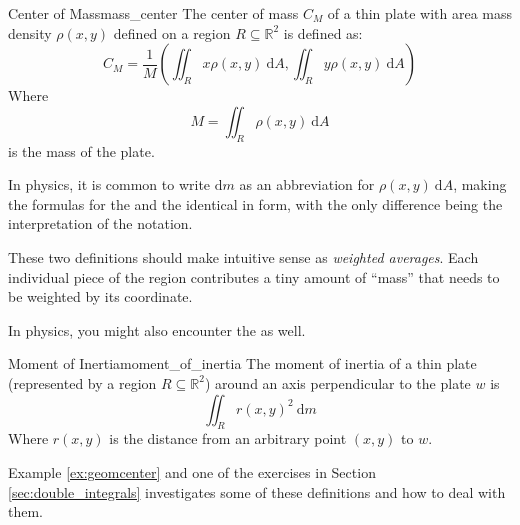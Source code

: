 \begin{adefinition}{Center of Mass}{mass_center}
    The center of mass $C_M$ of a thin plate with area mass density $\rho(x,y)$ defined on a region $R \subseteq \mathbb{R}^2$ is defined as:
    \begin{equation*}
        C_M = \frac{1}{M}\left(\iint_R x \rho(x,y) \ \mathrm{d} A, \iint_R y \rho(x,y) \ \mathrm{d} A \right)
    \end{equation*}
    Where
    \begin{equation*}
        M = \iint_R \rho(x,y) \ \mathrm{d} A
    \end{equation*}
    is the mass of the plate.

\end{adefinition}

\begin{remark}
    In physics, it is common to write $\mathrm{d} m$ as an abbreviation for $ \rho(x,y) \ \mathrm{d} A$, making the formulas for the  and the  identical in form, with the only difference being the interpretation of the notation.
\end{remark}

\begin{remark}
    These two definitions should make intuitive sense as \textit{weighted averages}. Each individual piece of the region contributes a tiny amount of ``mass'' that needs to be weighted by its coordinate.
\end{remark}

In physics, you might also encounter the  as well.

\begin{adefinition}{Moment of Inertia}{moment_of_inertia}
    The moment of inertia of a thin plate (represented by a region $R\subseteq \mathbb{R}^2$) around an axis perpendicular to the plate $w$ is
    \begin{equation*}
        \iint_R r(x,y)^2 \ \mathrm{d}m
    \end{equation*}
    Where $r(x,y)$ is the distance from an arbitrary point $(x,y)$ to $w$.
\end{adefinition}

Example \ref{ex:geomcenter} and one of the exercises in Section \ref{sec:double_integrals} investigates some of these definitions and how to deal with them.

